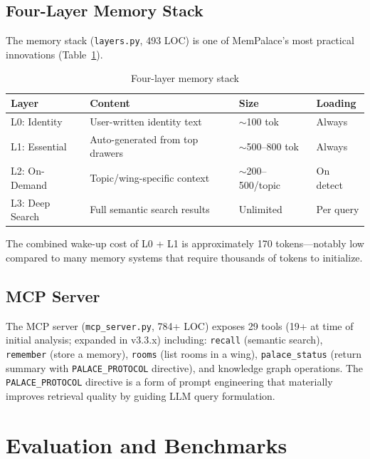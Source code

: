 \documentclass[twoside,11pt]{article}
\begin{document}
\subsection{Four-Layer Memory Stack}
\label{sec:stack}

The memory stack (\texttt{layers.py}, 493 LOC) is one of MemPalace's most
practical innovations (Table~\ref{tab:stack}).

\begin{table}[t]
\centering
\caption{Four-layer memory stack}
\label{tab:stack}
\small
\begin{tabular}{@{}llll@{}}
\toprule
\textbf{Layer} & \textbf{Content} & \textbf{Size} & \textbf{Loading} \\
\midrule
L0: Identity    & User-written identity text         & $\sim$100 tok     & Always \\
L1: Essential   & Auto-generated from top drawers    & $\sim$500--800 tok & Always \\
L2: On-Demand   & Topic/wing-specific context        & $\sim$200--500/topic & On detect \\
L3: Deep Search & Full semantic search results       & Unlimited          & Per query \\
\bottomrule
\end{tabular}
\end{table}

The combined wake-up cost of L0 + L1 is approximately 170 tokens---notably low
compared to many memory systems that require thousands of tokens to initialize.

\subsection{MCP Server}

The MCP server (\texttt{mcp\_server.py}, 784+ LOC) exposes 29 tools
(19+ at time of initial analysis; expanded in v3.3.x) including:
\texttt{recall} (semantic search), \texttt{remember} (store a memory),
\texttt{rooms} (list rooms in a wing), \texttt{palace\_status} (return summary
with \texttt{PALACE\_PROTOCOL} directive), and knowledge graph operations.
The \texttt{PALACE\_PROTOCOL} directive is a form of prompt engineering that
materially improves retrieval quality by guiding LLM query formulation.

\section{Evaluation and Benchmarks}
\label{sec:eval}
\end{document}
